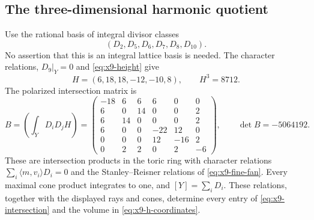 \subsection{The three-dimensional harmonic quotient}
Use the rational basis of integral divisor classes
\[
 (D_2,D_5,D_6,D_7,D_8,D_{10}).
\]
No assertion that this is an integral lattice basis is needed.
The character relations, $D_9|_Y=0$ and \eqref{eq:x9-height} give
\begin{equation}\label{eq:x9-h-coordinates}
 H=(6,18,18,-12,-10,8),\qquad H^3=8712.
\end{equation}
The polarized intersection matrix is
\begin{equation}\label{eq:x9-intersection}
 B=\left(\int_Y D_iD_jH\right)=
 \begin{pmatrix}
 -18&6&6&6&0&0\\
 6&0&14&0&0&2\\
 6&14&0&0&0&2\\
 6&0&0&-22&12&0\\
 0&0&0&12&-16&2\\
 0&2&2&0&2&-6
 \end{pmatrix},\qquad \det B=-5064192.
\end{equation}
These are intersection products in the toric ring with character
relations $\sum_i\langle m,v_i\rangle D_i=0$ and the
Stanley--Reisner relations of \eqref{eq:x9-fine-fan}. Every maximal
cone product integrates to one, and $[Y]=\sum_iD_i$.
These relations, together with the displayed rays and cones, determine
every entry of \eqref{eq:x9-intersection} and the volume in
\eqref{eq:x9-h-coordinates}.

